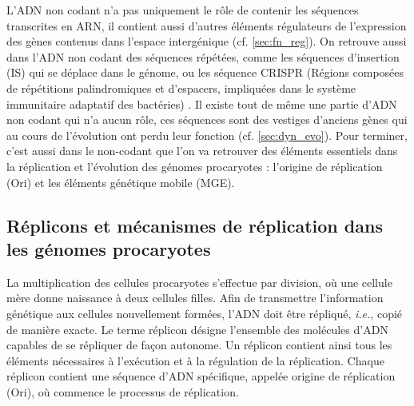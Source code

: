 L'ADN non codant n'a pas uniquement le rôle de contenir les séquences transcrites en ARN, il contient aussi d'autres éléments régulateurs de l'expression des gènes contenus dans l'espace intergénique (cf. \autoref{sec:fn_reg}). On retrouve aussi dans l'ADN non codant des séquences répétées, comme les séquences d'insertion (IS) qui se déplace dans le génome, ou les séquence CRISPR (Régions composées de répétitions palindromiques et d’espacers, impliquées dans le système immunitaire adaptatif des bactéries) \cite{jansen_identification_2002,bolotin_clustered_2005}. Il existe tout de même une partie d'ADN non codant qui n'a aucun rôle, ces séquences sont des vestiges d'anciens gènes qui au cours de l'évolution ont perdu leur fonction (cf. \autoref{sec:dyn_evo}). Pour terminer, c'est aussi dans le non-codant que l'on va retrouver des éléments essentiels dans la réplication et l'évolution des génomes procaryotes : l'origine de réplication (Ori) et les éléments génétique mobile (MGE). 

\subsection{Réplicons et mécanismes de réplication dans les génomes procaryotes}
\label{sec:replicons}
La multiplication des cellules procaryotes s'effectue par division, où une cellule mère donne naissance à deux cellules filles. Afin de transmettre l’information génétique aux cellules nouvellement formées, l’ADN doit être répliqué, \textit{i.e.}, copié de manière exacte. Le terme réplicon désigne l’ensemble des molécules d’ADN capables de se répliquer de façon autonome. Un réplicon contient ainsi tous les éléments nécessaires à l’exécution et à la régulation de la réplication. Chaque réplicon contient une séquence d’ADN spécifique, appelée origine de réplication (Ori), où commence le processus de réplication.

